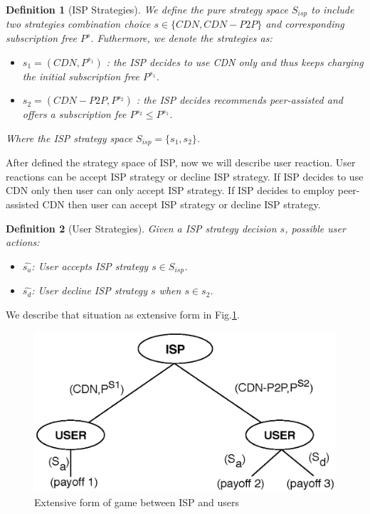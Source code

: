\documentclass[paper]{ieice}
\begin{document}
\newtheorem{theorem}{Definition}
\begin{theorem}[ISP Strategies]
We define the pure strategy space $S_{isp}$ to include two strategies combination choice $s \in \{CDN, CDN-P2P\}$ and corresponding subscription free $P^{s}$.
Futhermore, we denote the strategies as:
\begin{itemize}
	\item $s_1 = (CDN, P^{s_1})$ : the ISP decides to use CDN only and thus keeps charging the initial subscription free $P^{s_1}$.
	\item $s_2 = (CDN-P2P, P^{s_2})$ : the ISP decides recommends peer-assisted and offers a subscription fee $P^{s_2} \le P^{s_1}$.
\end{itemize}
Where the ISP strategy space $S_{isp} = \{s_1,s_2\}$.
\end{theorem}

After defined the strategy space of ISP, now we will describe user reaction.
User reactions can be accept ISP strategy or decline ISP strategy.  
If ISP decides to use CDN only then user can only accept ISP strategy.  
If ISP decides to employ peer-assisted CDN then user can accept ISP strategy or decline ISP strategy.

\newtheorem{theorem2}{Definition}
\begin{theorem}[User Strategies]
Given a ISP strategy decision $s$, possible user actions:
\begin{itemize}
\item $\hat{s_a}$: User accepts ISP strategy $s \in S_{isp}$.
\item $\hat{s_d}$: User decline ISP strategy $s$ when $s\in{s_2}$.
\end{itemize}
\end{theorem}
We describe that situation as extensive form in Fig.\ref{fig:gametree}.

\begin{figure}[tb] 
\begin{center}
\includegraphics[scale=0.35]{graphs/game-tree.eps}
\end{center}
\caption{Extensive form of game between ISP and users}
\label{fig:gametree}
\vspace{-2mm}
\end{figure}
\end{document}
